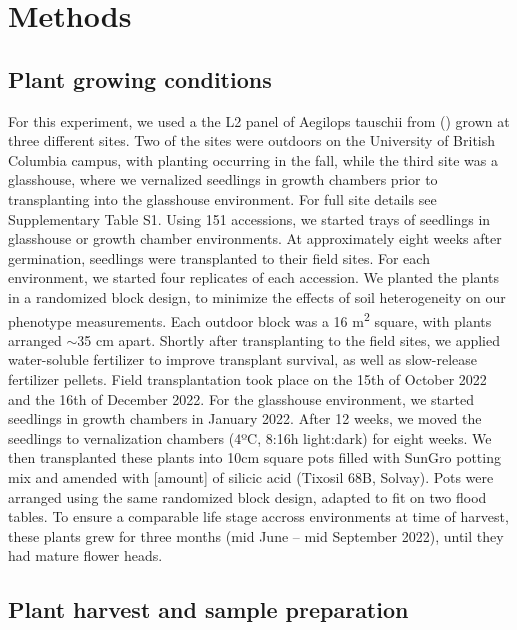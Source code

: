 \documentclass[12pt, letterpaper, ]{report}
\begin{document}
\section{Methods}

\subsection{Plant growing conditions}

For this experiment, we used a the L2 panel of Aegilops tauschii from (\cite{gaurav_population_2021}) grown at three different sites. Two of the sites were outdoors on the University of British Columbia campus, with planting occurring in the fall, while the third site was a glasshouse, where we vernalized seedlings in growth chambers prior to transplanting into the glasshouse environment. For full site details see Supplementary Table S1. Using 151 accessions, we started trays of seedlings in glasshouse or growth chamber environments. At approximately eight weeks after germination, seedlings were transplanted to their field sites. For each environment, we started four replicates of each accession. We planted the plants in a randomized block design, to minimize the effects of soil heterogeneity on our phenotype measurements. Each outdoor block was a 16 m\textsuperscript{2} square, with plants arranged $\sim$35 cm apart. Shortly after transplanting to the field sites, we applied water-soluble fertilizer to improve transplant survival, as well as slow-release fertilizer pellets. Field transplantation took place on the 15th of October 2022 and the 16th of December 2022. For the glasshouse environment, we started seedlings in growth chambers in January 2022. After 12 weeks, we moved the seedlings to vernalization chambers (4ºC, 8:16h light:dark) for eight weeks. We then transplanted these plants into 10cm square pots filled with SunGro potting mix and amended with [amount] of silicic acid (Tixosil 68B, Solvay). Pots were arranged using the same randomized block design, adapted to fit on two flood tables. To ensure a comparable life stage accross environments at time of harvest, these plants grew for three months (mid June – mid September 2022), until they had mature flower heads. 

\subsection{Plant harvest and sample preparation}
\end{document}
